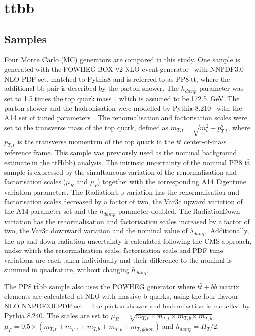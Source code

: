 \section{ttbb}
\label{sec:ttbb}

\subsection{Samples}
Four Monte Carlo (MC) generators are compared in this study. %
One sample is generated with the \textsc{POWHEG-BOX v2} NLO event generator~\cite{Nason:2004rx,Frixione:2007vw,Alioli:2010xd,Campbell:2014kua} with NNPDF3.0 NLO PDF set, matched to Pythia8 and is referred to as PP8 $\mathrm{t\bar{t}}$, where the additional bb-pair is described by the parton shower. The $h_{damp}$ parameter was set to 1.5 times the top quark mass~\cite{ATL-PHYS-PUB-2016-020}, which is assumed to be 172.5~GeV. The parton shower and the hadronisation were modelled by Pythia 8.210~\cite{PhysRevD.78.014026} with the A14 set of tuned parameters~\cite{ATL-PHYS-PUB-2014-021}. The renormalisation and factorisation scales were set to the transverse mass of the top quark, defined as $m_{T,t} = \sqrt{m^2_t + p^2_{T,t}}$, where $p_{T,t}$ is the transverse momentum of the top quark in the $t\overline{t}$ center-of-mass reference frame. This sample was previously used as the nominal background estimate in the ttH(bb) analysis.
The intrinsic uncertainty of the nominal PP8 $\mathrm{t\bar{t}}$ sample is expressed by the simultaneous variation of the renormalisation and factorisation scales ($\mu_R$ and $\mu_F$) together with the corresponding A14 Eigentune variation parameters. The RadiationUp variation has the renormalisation and factorisation scales decreased by a factor of two, the Var3c upward variation of the A14 parameter set and the $h_{damp}$ parameter doubled. The RadiationDown variation has the renormalisation and factorisation scales increased by a factor of two, the Var3c downward variation and the nominal value of $h_{damp}$.
Additionally, the up and down radiation uncertainty is calculated following the CMS approach, under which the renormalisation scale, factorisation scale and PDF tune variations are each taken individually and their difference to the nominal is summed in quadrature, without changing $h_{damp}$.

The PP8 $\mathrm{t\bar{t}b\bar{b}}$ sample also uses the POWHEG generator where $t\bar{t}+b\bar{b}$ matrix elements are calculated at NLO with massive b-quarks, using the four-flavour NLO NNPDF3.0 PDF set~\cite{Jezo:2018yaf}. The parton shower and hadronisation is modelled by Pythia 8.240. The scales are set to $\mu_R=\sqrt[4]{m_{T,t}\times m_{T,\bar{t}}\times m_{T,b}\times m_{T,\bar{b}} }$, $\mu_F=0.5\times(m_{T,t}+m_{T,\bar{t}}+m_{T,b}+ m_{T,\bar{b}}+m_{T,gluon})$ and $h_{damp}=H_T/2$.

